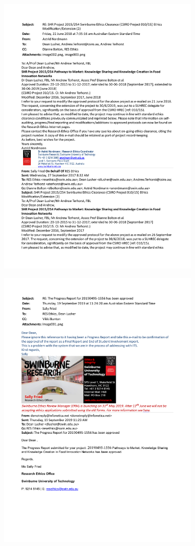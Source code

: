 \begin{figure}[hbt!]
    \centering
    \includegraphics[width = 0.9\textwidth]{Images/SHR_2015_254.pdf}
    \caption[Evidence of ethics approval -- Swinburne]{}
    \label{fig:swin_ethics_approval}
\end{figure}

\begin{figure}[hbt!]
    \centering
    \includegraphics[width = 0.9\textwidth]{Images/SHR_2015_254_FINAL.pdf}
    \caption[Evidence of ethics conclusion -- Swinburne]{}
    \label{fig:swin_ethics_approval}
\end{figure}
